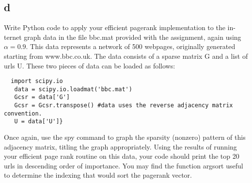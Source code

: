\documentclass[11pt]{article}
\begin{document}
\subsection{d}

Write Python code to apply your efficient pagerank implementation to the in- ternet graph data in the file bbc.mat provided with the assignment, again using $\alpha = 0.9$. This data represents a network of 500 webpages, originally generated starting from www.bbc.co.uk. The data consists of a sparse matrix G and a list of urls U. These two pieces of data can be loaded as follows:

\begin{verbatim}
  import scipy.io
   data = scipy.io.loadmat('bbc.mat')
   Gcsr = data['G']
   Gcsr = Gcsr.transpose() #data uses the reverse adjacency matrix convention.
   U = data['U']}
\end{verbatim}

Once again, use the spy command to graph the sparsity (nonzero) pattern of this adjacency matrix, titling the graph appropriately. Using the results of running your efficient page rank routine on this data, your code should print the top 20 urls in descending order of importance. You may find the function argsort useful to determine the indexing that would sort the pagerank vector.
\end{document}
